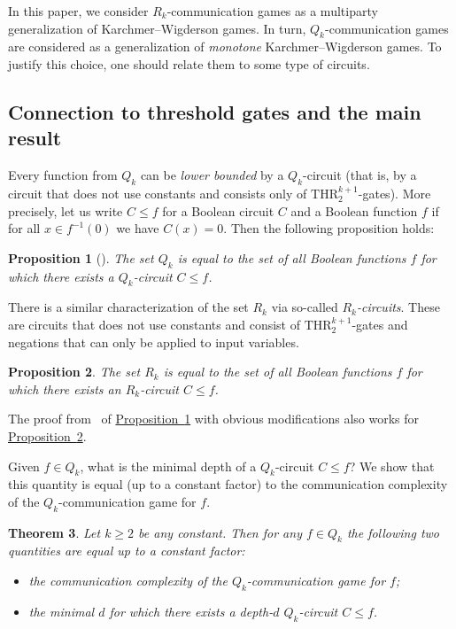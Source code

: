 \documentclass[11pt]{article}
\numberwithin{equation}{section}
\newtheorem{theorem}{Theorem}[section]
\newtheorem{proposition}[theorem]{Proposition}
\theoremstyle{definition}
\theoremstyle{plain}
\newcommand{\expref}[2]{\hyperref[#2]{#1~\ref{#2}}}
\def\THR{\mathrm{THR}}
\begin{document}
In this paper, we consider $R_k$-communication games as a multiparty generalization of Karchmer--Wigderson games. In turn, $Q_k$-communication games are considered as a generalization of \emph{monotone} Karchmer--Wigderson games. To justify this choice, one should relate them to some type of circuits. 

\subsection{Connection to threshold gates and the main result}

Every function from $Q_k$ can be \emph{lower bounded} by a $Q_k$-circuit (that is, by a circuit that does not use constants and consists only of $\THR^{k + 1}_2$-gates). More precisely, let us write $C \le f$ for a Boolean circuit $C$ and a Boolean function $f$ if for all $x\in f^{-1}(0)$ we have $C(x) = 0$. Then the following proposition holds:
\begin{proposition}[\cite{Cohen2013}]
\label{Q_k_char}
The set $Q_k$ is equal to the set of all Boolean functions $f$ for which there exists a $Q_k$-circuit $C\le f$.
\end{proposition}

There is a similar characterization of the set $R_k$ via so-called \emph{$R_k$-circuits}. These are circuits that does not use constants and consist of $\THR^{k + 1}_2$-gates and negations that can only be applied to input variables.
\begin{proposition}
\label{R_k_char}
The set $R_k$ is equal to the set of all Boolean functions $f$ for which there exists an $R_k$-circuit $C \le f$.
\end{proposition}
The proof from~\cite{Cohen2013} of \expref{Proposition}{Q_k_char} with obvious modifications also works for \expref{Proposition}{R_k_char}.

Given $f\in Q_k$, what is the minimal depth of a $Q_k$-circuit $C\le f$? We show that this quantity is equal (up to a constant factor) to the communication complexity of the $Q_k$-communication game for $f$.

\begin{theorem}
\label{Q_k_main}
Let $k \ge 2$ be any constant. Then for any $f\in Q_k$ the following two quantities are equal up to a constant factor:
\begin{itemize}
\item the communication complexity of the $Q_k$-communication game for $f$;
\item the minimal $d$ for which there exists a
%
depth-$d$   %
$Q_k$-circuit $C \le f$.
\end{itemize}
\end{theorem}
\end{document}
